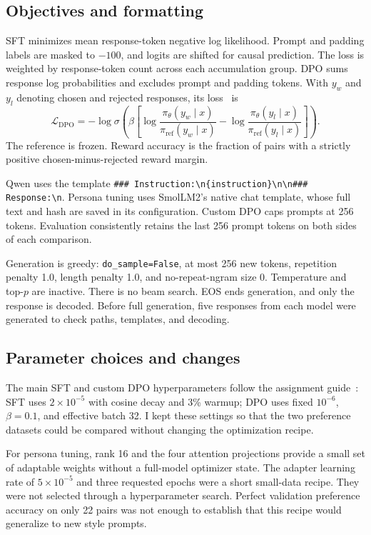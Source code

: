 \documentclass{article}
\begin{document}
\subsection{Objectives and formatting}
SFT minimizes mean response-token negative log likelihood. Prompt and padding labels are masked to $-100$, and logits are shifted for causal prediction. The loss is weighted by response-token count across each accumulation group. DPO sums response log probabilities and excludes prompt and padding tokens. With $y_w$ and $y_l$ denoting chosen and rejected responses, its loss~\cite{dpo} is
\begin{equation}
\mathcal{L}_{\mathrm{DPO}}=-\log\sigma\left(\beta\left[
\log\frac{\pi_\theta(y_w\mid x)}{\pi_{\mathrm{ref}}(y_w\mid x)}-
\log\frac{\pi_\theta(y_l\mid x)}{\pi_{\mathrm{ref}}(y_l\mid x)}
\right]\right).
\end{equation}
The reference is frozen. Reward accuracy is the fraction of pairs with a strictly positive chosen-minus-rejected reward margin.

Qwen uses the template \texttt{\#\#\# Instruction:\textbackslash n\{instruction\}\textbackslash n\textbackslash n\#\#\# Response:\textbackslash n}. Persona tuning uses SmolLM2's native chat template, whose full text and hash are saved in its configuration. Custom DPO caps prompts at 256 tokens. Evaluation consistently retains the last 256 prompt tokens on both sides of each comparison.

Generation is greedy: \texttt{do\_sample=False}, at most 256 new tokens, repetition penalty 1.0, length penalty 1.0, and no-repeat-ngram size 0. Temperature and top-$p$ are inactive. There is no beam search. EOS ends generation, and only the response is decoded. Before full generation, five responses from each model were generated to check paths, templates, and decoding.

\subsection{Parameter choices and changes}
The main SFT and custom DPO hyperparameters follow the assignment guide~\cite{manual}: SFT uses $2\times10^{-5}$ with cosine decay and 3\% warmup; DPO uses fixed $10^{-6}$, $\beta=0.1$, and effective batch 32. I kept these settings so that the two preference datasets could be compared without changing the optimization recipe.

For persona tuning, rank 16 and the four attention projections provide a small set of adaptable weights without a full-model optimizer state. The adapter learning rate of $5\times10^{-5}$ and three requested epochs were a short small-data recipe. They were not selected through a hyperparameter search. Perfect validation preference accuracy on only 22 pairs was not enough to establish that this recipe would generalize to new style prompts.
\end{document}
